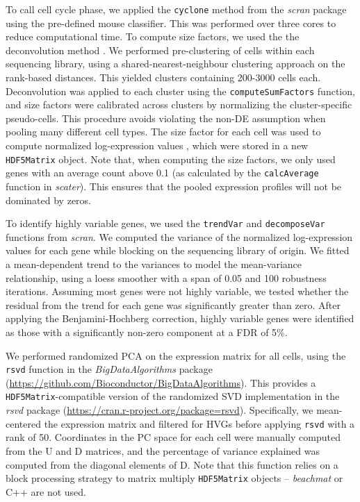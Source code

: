 \documentclass{article}
\newcommand{\beachmat}{\textit{beachmat}}
\newcommand{\code}[1]{\texttt{#1}}
\begin{document}
To call cell cycle phase, we applied the \code{cyclone} method \cite{scialdone2015computational} from the \textit{scran} package using the pre-defined mouse classifier.
This was performed over three cores to reduce computational time.
To compute size factors, we used the the deconvolution method \cite{lun2016pooling}.
We performed pre-clustering of cells within each sequencing library, using a shared-nearest-neighbour clustering approach \cite{xu2015identification} on the rank-based distances.
This yielded clusters containing 200-3000 cells each.
Deconvolution was applied to each cluster using the \code{computeSumFactors} function, and size factors were calibrated across clusters by normalizing the cluster-specific pseudo-cells.
This procedure avoids violating the non-DE assumption when pooling many different cell types.
The size factor for each cell was used to compute normalized log-expression values \cite{lun2016stepbystep}, which were stored in a new \code{HDF5Matrix} object.
Note that, when computing the size factors, we only used genes with an average count above 0.1 (as calculated by the \code{calcAverage} function in \textit{scater}).
This ensures that the pooled expression profiles will not be dominated by zeros.

To identify highly variable genes, we used the \code{trendVar} and \code{decomposeVar} functions from \textit{scran}.
We computed the variance of the normalized log-expression values for each gene while blocking on the sequencing library of origin.
We fitted a mean-dependent trend to the variances to model the mean-variance relationship, using a loess smoother with a span of 0.05 and 100 robustness iterations.
Assuming most genes were not highly variable, we tested whether the residual from the trend for each gene was significantly greater than zero.
After applying the Benjamini-Hochberg correction, highly variable genes were identified as those with a significantly non-zero component at a FDR of 5\%.

We performed randomized PCA \cite{halko2011finding} on the expression matrix for all cells,
using the \code{rsvd} function in the \textit{BigDataAlgorithms} package (\url{https://github.com/Bioconductor/BigDataAlgorithms}).
This provides a \code{HDF5Matrix}-compatible version of the randomized SVD implementation in the \textit{rsvd} package (\url{https://cran.r-project.org/package=rsvd}).
Specifically, we mean-centered the expression matrix and filtered for HVGs before applying \code{rsvd} with a rank of 50.
Coordinates in the PC space for each cell were manually computed from the U and D matrices, and the percentage of variance explained was computed from the diagonal elements of D.
Note that this function relies on a block processing strategy to matrix multiply \code{HDF5Matrix} objects -- \beachmat{} or C++ are not used.
\end{document}
